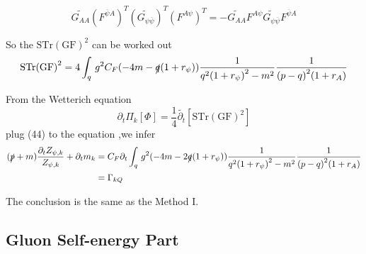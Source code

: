 \documentclass[UTF8]{ctexart}
\begin{document}
\begin{equation}
\widetilde{G_{AA}}{(F^{\overline{\psi}A})}^{T}{(\widetilde{G_{\psi\overline{\psi}}})}^{T}{(F^{A\psi})}^{T}=-\widetilde{G_{AA}}F^{A\psi}\widetilde{G_{\psi\overline{\psi}}}F^{\overline{\psi}A}
\end{equation}
\par So the $\mathrm{STr}{(\mathrm{GF})}^2$ can be worked out
\begin{equation}
\mathrm{STr}{(\mathrm{GF})}^2=4\int_{q}\,g^2 C_F (-4m-\slashed{q}(1+r_{\psi}))\frac{1}{q^2{(1+r_{\psi})}^2-m^2}\frac{1}{{(p-q)}^2 (1+r_A)}
\end{equation}
\par From the Wetterich equation
\begin{equation}
\partial_{t}\Pi_k [\Phi]=\frac{1}{4}\widetilde{\partial_{t}}[\mathrm{STr}{(\mathrm{GF})}^2]
\end{equation}
plug (44) to the equation ,we infer
\begin{align}
(\slashed{p}+m)\frac{\partial_{t}Z_{\psi,k}}{Z_{\psi,k}}+\partial_{t}m_{k}
&=C_F\partial_{t}\int_{q}\,g^2 (-4m-2\slashed{q}(1+r_{\psi}))\frac{1}{q^2{(1+r_{\psi})}^2-m^2}\frac{1}{{(p-q)}^2 (1+r_A)}
\notag\\&=\Gamma_{kQ}
\end{align}
\par The conclusion is the same as the Method I.
\subsection{Gluon Self-energy Part}
\end{document}
